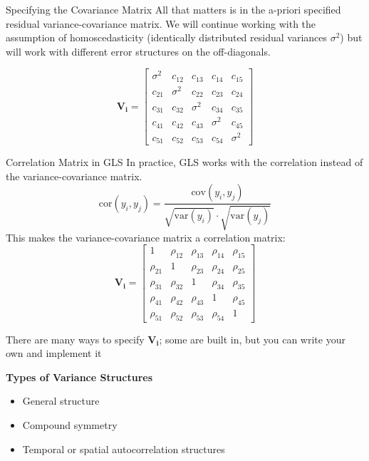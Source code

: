 \documentclass{beamer}
\begin{document}
\begin{frame}{Specifying the Covariance Matrix}
  All that matters is in the a-priori specified residual variance-covariance matrix.
  We will continue working with the assumption of homoscedasticity (identically distributed residual variances $\sigma^2$) but will work with different error structures on the off-diagonals.
  \vspace{0.5cm}
  
  \[
  \mathbf{V_i} = 
  \begin{bmatrix}
  \sigma^2 & c_{12} & c_{13} & c_{14} & c_{15} \\
  c_{21} & \sigma^2 & c_{22} & c_{23} & c_{24} \\
  c_{31} & c_{32} & \sigma^2 & c_{34} & c_{35} \\
  c_{41} & c_{42} & c_{43} & \sigma^2 & c_{45} \\
  c_{51} & c_{52} & c_{53} & c_{54} & \sigma^2
  \end{bmatrix}
  \]
\end{frame}

\begin{frame}{Correlation Matrix in GLS}
  In practice, GLS works with the correlation instead of the variance-covariance matrix.
  \[
  \text{cor}(y_i,y_j) = \frac{\text{cov}(y_i, y_j)}{\sqrt{\text{var}(y_i)} \cdot \sqrt{\text{var}(y_j)}}
  \]
  This makes the variance-covariance matrix a correlation matrix:
  \[
  \mathbf{V_i} = 
  \begin{bmatrix}
  1 & \rho_{12} & \rho_{13} & \rho_{14} & \rho_{15} \\
  \rho_{21} & 1 & \rho_{23} & \rho_{24} & \rho_{25} \\
  \rho_{31} & \rho_{32} & 1 & \rho_{34} & \rho_{35} \\
  \rho_{41} & \rho_{42} & \rho_{43} & 1 & \rho_{45} \\
  \rho_{51} & \rho_{52} & \rho_{53} & \rho_{54} & 1
  \end{bmatrix}
  \]
  \vspace{0.5cm}

  \centering \tiny There are many ways to specify $\mathbf{V_i}$; some are built in, but you can write your own and implement it
\end{frame}

\begin{frame}
  \large
  \textbf{Types of Variance Structures}
  \begin{itemize}
    \item General structure
    \item Compound symmetry
    \item Temporal or spatial autocorrelation structures
  \end{itemize}
\end{frame}
\end{document}
